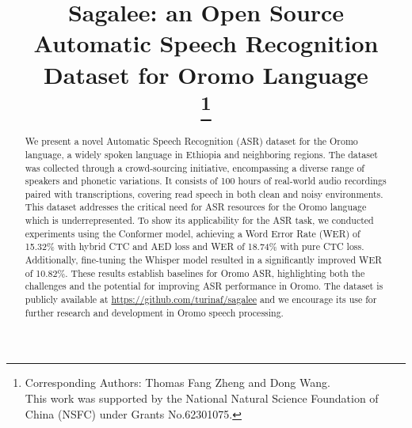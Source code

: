 \documentclass[conference, 9pt]{IEEEtran}
\begin{document}
\title{Sagalee: an Open Source Automatic Speech Recognition Dataset for Oromo Language\\
\thanks{ Corresponding Authors: Thomas Fang Zheng and Dong Wang. \\ This work was supported by the National Natural Science Foundation of China (NSFC) under Grants No.62301075.}
}

\author{


}

\maketitle

\begin{abstract}
We present a novel Automatic Speech Recognition (ASR) dataset  for the Oromo language, a widely spoken language in Ethiopia and neighboring regions. The dataset was collected through a crowd-sourcing initiative, encompassing a diverse range of speakers and phonetic variations. It consists of 100 hours of real-world audio recordings paired with transcriptions, covering read speech in both clean and noisy environments. This dataset addresses the critical need for ASR resources for the Oromo language which is underrepresented. To show its applicability for the ASR task, we conducted experiments using the Conformer model, achieving a Word Error Rate (WER) of 15.32\% with hybrid CTC and AED loss and WER of 18.74\% with pure CTC loss.  Additionally, fine-tuning the Whisper model resulted in a significantly improved WER of 10.82\%.  These  results establish baselines for Oromo ASR, highlighting both the challenges and the potential for improving ASR performance in Oromo. The dataset is publicly available at \href{https://github.com/turinaf/sagalee}{https://github.com/turinaf/sagalee} and we encourage its use for further research and development in Oromo speech processing.
\end{abstract}
\end{document}
